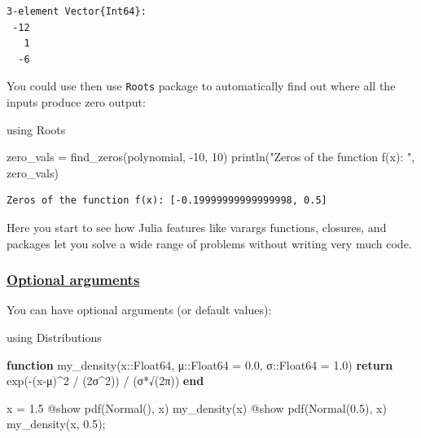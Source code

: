 \documentclass[
]{article}
\newenvironment{Shaded}{\begin{snugshade}}{\end{snugshade}}
\newcommand{\BuiltInTok}[1]{\textcolor[rgb]{0.00,0.23,0.31}{#1}}
\newcommand{\ControlFlowTok}[1]{\textcolor[rgb]{0.00,0.23,0.31}{\textbf{#1}}}
\newcommand{\DataTypeTok}[1]{\textcolor[rgb]{0.68,0.00,0.00}{#1}}
\newcommand{\FloatTok}[1]{\textcolor[rgb]{0.68,0.00,0.00}{#1}}
\newcommand{\FunctionTok}[1]{\textcolor[rgb]{0.28,0.35,0.67}{#1}}
\newcommand{\ImportTok}[1]{\textcolor[rgb]{0.00,0.46,0.62}{#1}}
\newcommand{\KeywordTok}[1]{\textcolor[rgb]{0.00,0.23,0.31}{\textbf{#1}}}
\newcommand{\NormalTok}[1]{\textcolor[rgb]{0.00,0.23,0.31}{#1}}
\newcommand{\OperatorTok}[1]{\textcolor[rgb]{0.37,0.37,0.37}{#1}}
\newcommand{\PreprocessorTok}[1]{\textcolor[rgb]{0.68,0.00,0.00}{#1}}
\newcommand{\StringTok}[1]{\textcolor[rgb]{0.13,0.47,0.30}{#1}}
\begin{document}
\begin{verbatim}
3-element Vector{Int64}:
 -12
   1
  -6
\end{verbatim}

You could use then use \texttt{Roots} package to automatically find out
where all the inputs produce zero output:

\begin{Shaded}
\begin{Highlighting}[]
\ImportTok{using} \BuiltInTok{Roots}

\NormalTok{zero\_vals }\OperatorTok{=} \FunctionTok{find\_zeros}\NormalTok{(polynomial, }\OperatorTok{{-}}\FloatTok{10}\NormalTok{, }\FloatTok{10}\NormalTok{)}
\FunctionTok{println}\NormalTok{(}\StringTok{"Zeros of the function f(x): "}\NormalTok{, zero\_vals)}
\end{Highlighting}
\end{Shaded}

\begin{verbatim}
Zeros of the function f(x): [-0.19999999999999998, 0.5]
\end{verbatim}

Here you start to see how Julia features like varargs functions,
closures, and packages let you solve a wide range of problems without
writing very much code.

\subsubsection{\texorpdfstring{\href{https://docs.julialang.org/en/v1/manual/functions/\#Optional-Arguments}{Optional
arguments}}{Optional arguments}}\label{optional-arguments}

You can have optional arguments (or default values):

\begin{Shaded}
\begin{Highlighting}[]
\ImportTok{using} \BuiltInTok{Distributions}

\KeywordTok{function} \FunctionTok{my\_density}\NormalTok{(x}\OperatorTok{::}\DataTypeTok{Float64}\NormalTok{, μ}\OperatorTok{::}\DataTypeTok{Float64 }\OperatorTok{=} \FloatTok{0.0}\NormalTok{, σ}\OperatorTok{::}\DataTypeTok{Float64 }\OperatorTok{=} \FloatTok{1.0}\NormalTok{)}
   \ControlFlowTok{return} \FunctionTok{exp}\NormalTok{(}\FunctionTok{{-}}\NormalTok{(x}\OperatorTok{{-}}\NormalTok{μ)}\OperatorTok{\^{}}\FloatTok{2} \OperatorTok{/}\NormalTok{ (}\FloatTok{2}\NormalTok{σ}\OperatorTok{\^{}}\FloatTok{2}\NormalTok{)) }\OperatorTok{/}\NormalTok{ (}\FunctionTok{σ*√}\NormalTok{(}\FloatTok{2}\NormalTok{π))}
\KeywordTok{end}

\NormalTok{x }\OperatorTok{=} \FloatTok{1.5}
\PreprocessorTok{@show} \FunctionTok{pdf}\NormalTok{(}\FunctionTok{Normal}\NormalTok{(), x) }\FunctionTok{my\_density}\NormalTok{(x)}
\PreprocessorTok{@show} \FunctionTok{pdf}\NormalTok{(}\FunctionTok{Normal}\NormalTok{(}\FloatTok{0.5}\NormalTok{), x) }\FunctionTok{my\_density}\NormalTok{(x, }\FloatTok{0.5}\NormalTok{);}
\end{Highlighting}
\end{Shaded}
\end{document}
